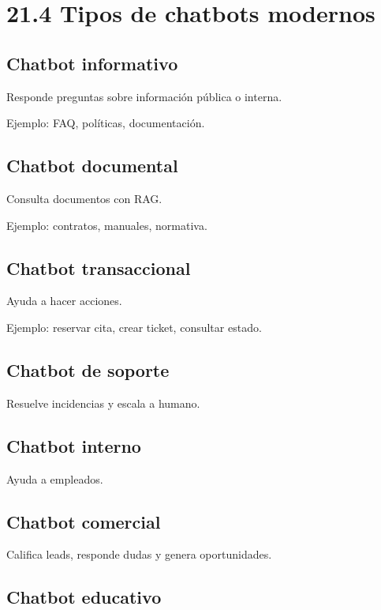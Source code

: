 \section{21.4 Tipos de chatbots
modernos}\label{tipos-de-chatbots-modernos}

\subsection{Chatbot informativo}\label{chatbot-informativo}

Responde preguntas sobre información pública o interna.

Ejemplo: FAQ, políticas, documentación.

\subsection{Chatbot documental}\label{chatbot-documental-1}

Consulta documentos con RAG.

Ejemplo: contratos, manuales, normativa.

\subsection{Chatbot transaccional}\label{chatbot-transaccional-1}

Ayuda a hacer acciones.

Ejemplo: reservar cita, crear ticket, consultar estado.

\subsection{Chatbot de soporte}\label{chatbot-de-soporte}

Resuelve incidencias y escala a humano.

\subsection{Chatbot interno}\label{chatbot-interno-1}

Ayuda a empleados.

\subsection{Chatbot comercial}\label{chatbot-comercial}

Califica leads, responde dudas y genera oportunidades.

\subsection{Chatbot educativo}\label{chatbot-educativo}

